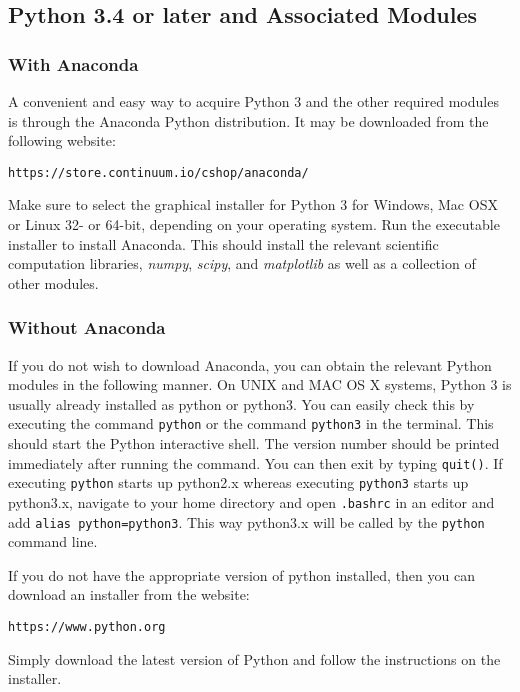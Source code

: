 \newcommand{\code}[1]{\textmd{\texttt{#1}}}

\subsection{Python 3.4 or later and Associated Modules}
\subsubsection{With Anaconda}
A convenient and easy way to acquire Python 3 and the other required modules is through the Anaconda Python distribution. It may be downloaded from the following website:
\begin{verbatim}
https://store.continuum.io/cshop/anaconda/
\end{verbatim}
Make sure to select the graphical installer for Python 3 for Windows, Mac OSX or Linux 32- or 64-bit, depending on your operating system. Run the executable installer to install Anaconda.
This should install the relevant scientific computation libraries, \textit{numpy}, \textit{scipy}, and \textit{matplotlib} as well as a collection of other modules.

\subsubsection{Without Anaconda}

If you do not wish to download Anaconda, you can obtain the relevant Python modules in the following manner.
On UNIX and MAC OS X systems, Python 3 is usually already installed as python or python3. You can easily check this by 
executing the command \texttt{python} or the command \texttt{python3} in the terminal.
This should start the Python interactive shell. The version number should be printed immediately after running the command. You can then exit by typing \texttt{quit()}.
If executing \texttt{python} starts up python2.x whereas executing \texttt{python3} starts up python3.x, navigate to your home directory and open 
\texttt{.bashrc} in an editor and add \texttt{alias python=python3}. 
This way python3.x will be called by the \texttt{python} command line. 

If you do not have the appropriate version of python installed, then you can download an installer from the website:
\begin{verbatim}
https://www.python.org
\end{verbatim}
Simply download the latest version of Python and follow the instructions on the installer.

